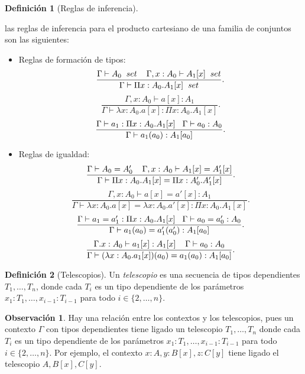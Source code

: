 \documentclass[11pt,oneside]{report}
\theoremstyle{plain}
\theoremstyle{definition}
\newtheorem{defi}{Definición}[chapter]
\newtheorem{obs}{Observación}[chapter]
\begin{document}
\begin{defi}[Reglas de inferencia]
\begin{center}
    \end{center}

    las reglas de inferencia para el producto cartesiano de una familia de conjuntos son las siguientes:
    \begin{itemize}
        \item Reglas de formación de tipos:
        \[
            \frac{\Gamma\vdash A_{0} \hspace{2mm} set \hspace{4mm} \Gamma, x:A_{0}\vdash A_{1}[x] \hspace{2mm} set}{\Gamma \vdash \Pi x:A_{0}.A_{1}[x] \hspace{2mm}set}
        .\]
        \[
            \frac{\Gamma, x:A_{0}\vdash a[x]:A_{1}}{\Gamma \vdash \lambda x:A_{0}.a[x] : \Pi x:A_{0}.A_{1}[x]} 
        .\]
        \[
            \frac{\Gamma \vdash a_{1}: \Pi x:A_{0}.A_{1}[x] \hspace{3mm} \Gamma\vdash a_{0}:A_{0}}{\Gamma \vdash a_{1}(a_{0}) : A_{1}[a_{0}]}
        .\]
        \item Reglas de igualdad:
        \[
            \frac{\Gamma\vdash A_{0} = A_{0}' \hspace{4mm} \Gamma, x:A_{0}\vdash A_{1}[x] = A_{1}'[x]}{\Gamma \vdash \Pi x:A_{0}.A_{1}[x] = \Pi x:A_{0}'.A_{1}'[x]}
        .\]
        \[
            \frac{\Gamma, x:A_{0}\vdash a[x] = a'[x] : A_{1}}{\Gamma \vdash \lambda x:A_{0}.a[x] = \lambda x:A_{0}.a'[x] : \Pi x:A_{0}.A_{1}[x]}
        .\]
        \[
            \frac{\Gamma \vdash a_{1} = a_{1}' : \Pi x:A_{0}.A_{1}[x] \hspace{3mm} \Gamma \vdash a_{0} = a_{0}':A_{0}}{\Gamma \vdash a_{1}(a_{0}) = a_{1}'(a_{0}'): A_1[a_{0}]}
        .\]
        \[
            \frac{\Gamma.x:A_{0}\vdash a_{1}[x]: A_{1}[x] \hspace{4mm} \Gamma\vdash a_{0} : A_{0}}{\Gamma\vdash(\lambda x:A_{0}.a_1[x])(a_{0}) = a_{1}(a_{0}) : A_{1}[a_{0}]}
        .\]
    \end{itemize}
\end{defi}

\begin{defi}[Telescopios]
    Un \emph{telescopio} es una secuencia de tipos dependientes \(T_{1}, \ldots, T_{n}\), donde cada \(T_{i}\) es un tipo dependiente de los parámetros \(x_{1}:T_{1}, \ldots, x_{i-1}:T_{i-1}\) para todo \(i \in \{2, \ldots, n\}\).
\end{defi}

\begin{obs}
    Hay una relación entre los contextos y los telescopios, pues un contexto \(\Gamma\) con tipos dependientes tiene ligado un telescopio \(T_{1}, \ldots, T_{n}\) donde cada \(T_{i}\) es un tipo dependiente de los parámetros \(x_{1}:T_{1}, \ldots, x_{i-1}:T_{i-1}\) para todo \(i \in \{2, \ldots, n\}\). Por ejemplo, el contexto \(x:A, y:B[x], z:C[y]\) tiene ligado el telescopio \(A, B[x], C[y]\).
\end{obs}
\end{document}
